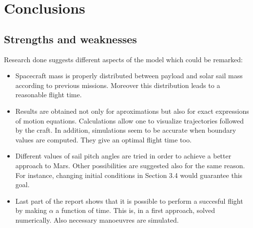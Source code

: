 \documentclass[twocolumn,12pt,a4paper]{article}
\numberwithin{equation}{section}
\begin{document}
\section{Conclusions}
\subsection{Strengths and weaknesses}
Research done suggests different aspects of the model which could be remarked:
\begin{itemize}
\item Spacecraft mass is properly distributed between payload and solar sail mass according to previous missions. Moreover this distribution leads to a reasonable flight time.
\item Results are obtained not only for aproximations but also for exact expressions of motion equations. Calculations allow one to visualize trajectories followed by the craft. In addition, simulations seem to be accurate when boundary values are computed. They give an optimal flight time too.
\item Different values of sail pitch angles are tried in order to achieve a better approach to Mars. Other possibilities are suggested also for the same reason. For instance, changing initial conditions in Section 3.4 would guarantee this goal.
\item Last part of the report shows that it is possible to perform a succesful flight by making $\alpha$ a function of time. This is, in a first approach, solved numerically. Also necessary manoeuvres are simulated. 

\end{itemize}
\clearpage



\onecolumn
\appendix
\end{document}
